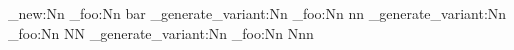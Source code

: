 \cs_new:Nn
  \module_foo:Nn
  { bar }
\cs_generate_variant:Nn  %
  \module_foo:Nn
  { nn }
\cs_generate_variant:Nn  %
  \module_foo:Nn
  { NN }
\cs_generate_variant:Nn  %
  \module_foo:Nn
  { Nnn }
